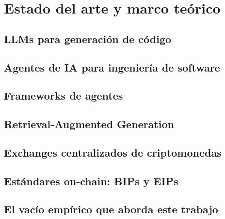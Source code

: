 \chapter{Estado del arte y marco teórico}\label{cap:estado-del-arte}


\section{LLMs para generación de código}

\section{Agentes de IA para ingeniería de software}

\section{Frameworks de agentes}

\section{Retrieval-Augmented Generation}

\section{Exchanges centralizados de criptomonedas}

\section{Estándares on-chain: BIPs y EIPs}

\section{El vacío empírico que aborda este trabajo}
